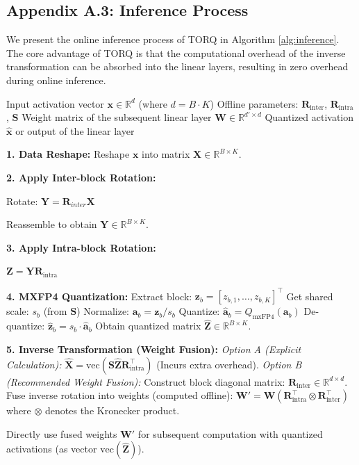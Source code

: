 \subsection*{Appendix A.3: Inference Process}
\label{app:inference_process}

We present the online inference process of TORQ in Algorithm \ref{alg:inference}. The core advantage of TORQ is that the computational overhead of the inverse transformation can be absorbed into the linear layers, resulting in zero overhead during online inference.

\begin{algorithm}[h]
   \caption{TORQ Online Inference}
   \label{alg:inference}
\begin{algorithmic}[1]
   \STATE \quad Input activation vector $\mathbf{x} \in \mathbb{R}^d$ (where $d = B \cdot K$)
   \STATE \quad Offline parameters: $\mathbf{R}_{\text{inter}}$, $\mathbf{R}_{\text{intra}}$, $\mathbf{S}$
   \STATE \quad Weight matrix of the subsequent linear layer $\mathbf{W} \in \mathbb{R}^{d' \times d}$
    Quantized activation $\hat{\mathbf{x}}$ or output of the linear layer
   
   \STATE \textbf{1. Data Reshape:} Reshape $\mathbf{x}$ into matrix $\mathbf{X} \in \mathbb{R}^{B \times K}$.
   
   \STATE \textbf{2. Apply Inter-block Rotation:}
   
   \STATE Rotate: $\mathbf{Y} = \mathbf{R}_{inter} \mathbf{X}$
   
   \STATE Reassemble to obtain $\mathbf{Y} \in \mathbb{R}^{B \times K}$.
   
   \STATE \textbf{3. Apply Intra-block Rotation:}
   
   \STATE $\mathbf{Z} = \mathbf{Y} \mathbf{R}_{\text{intra}}$
   
   \STATE \textbf{4. MXFP4 Quantization:}
       \STATE Extract block: $\mathbf{z}_b = [z_{b,1}, \dots, z_{b,K}]^\top$
       \STATE Get shared scale: $s_b$ (from $\mathbf{S}$)
       \STATE Normalize: $\mathbf{a}_b = \mathbf{z}_b / s_b$
       \STATE Quantize: $\hat{\mathbf{a}}_b = Q_{\text{mxFP4}}(\mathbf{a}_b)$
       \STATE De-quantize: $\hat{\mathbf{z}}_b = s_b \cdot \hat{\mathbf{a}}_b$
   \ENDFOR
   \STATE Obtain quantized matrix $\hat{\mathbf{Z}} \in \mathbb{R}^{B \times K}$.
   
   \STATE \textbf{5. Inverse Transformation (Weight Fusion):}
   \STATE \textit{Option A (Explicit Calculation):} $\hat{\mathbf{X}} = \text{vec}(\mathbf{S} \hat{\mathbf{Z}} \mathbf{R}_{\text{intra}}^\top)$ (Incurs extra overhead).
   \STATE \textit{Option B (Recommended Weight Fusion):}
   \STATE Construct block diagonal matrix: $\mathbf{R}_{\text{inter}} \in \mathbb{R}^{d \times d}$.
   \STATE Fuse inverse rotation into weights (computed offline):
   $\mathbf{W}' = \mathbf{W} (\mathbf{R}_{\text{intra}}^\top \otimes \mathbf{R}_{\text{inter}}^\top)$
   \STATE where $\otimes$ denotes the Kronecker product.
   
    Directly use fused weights $\mathbf{W}'$ for subsequent computation with quantized activations (as vector $\text{vec}(\hat{\mathbf{Z}})$).
\end{algorithmic}
\end{algorithm}